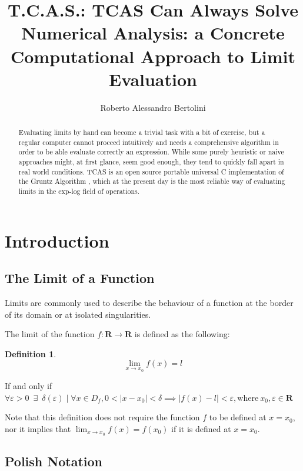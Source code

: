\documentclass{article}
\title{\textbf{T.C.A.S.}: \textbf{T}CAS \textbf{C}an \textbf{A}lways \textbf{S}olve \\
	\large Numerical Analysis: a Concrete Computational Approach to Limit Evaluation}
\author{Roberto Alessandro Bertolini}
\date{}
\affil{Liceo "P. Nervi - G. Ferrari" - Morbegno}
\theoremstyle{plain}
\theoremstyle{definition}
\newtheorem*{defn*}{Definition}
\theoremstyle{algorithm}
\begin{document}
	\maketitle
	
	\begin{abstract}
		Evaluating limits by hand can become a trivial task with a bit of exercise, but a regular computer cannot proceed intuitively and needs a comprehensive algorithm in order to be able evaluate correctly an expression. 
		While some purely heuristic or naive approaches might, at first glance, seem good enough, they tend to quickly fall apart in real world conditions. TCAS is an open source portable universal C implementation of the Gruntz Algorithm \cite{gruntz}, which at the present day is the most reliable way of evaluating limits in the exp-log field of operations.
	\end{abstract}
	
	\tableofcontents
	
	\newpage	
	
	\section{Introduction}
	
	\subsection{The Limit of a Function}
	
	Limits are commonly used to describe the behaviour of a function at the border of its domain or at isolated singularities.
	
	The limit of the function $ f: \mathbf{R} \rightarrow \mathbf{R} $ is defined as the following:
	
	\begin{defn*}
		\[ 
		\lim_{x \to x_{0}}{f(x) = l} 
		\]
		
		If and only if \( 
		\forall \varepsilon > 0 \enspace \exists \enspace \delta(\varepsilon) \mid \forall x \in D_{f}, 0 < \mid x - x_{0} \mid < \delta \implies \mid f(x) - l \mid < \varepsilon, \text{where} \: x_{0}, \varepsilon \in \mathbf{R}
		\)
	\end{defn*}
	
	Note that this definition does not require the function \(f\) to be defined at \(x = x_{0}\), nor it implies that \(\lim_{x \to x_{0}}{f(x)} = f(x_{0})\) if it is defined at \(x = x_{0}\).
	
	\subsection{Polish Notation} \label{sec:pn}
	
\end{document}
